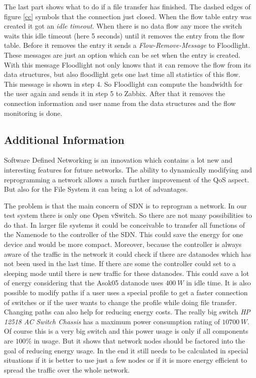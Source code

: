 The last part shows what to do if a file transfer has finished. The dashed edges of figure \ref{cc} symbols that the connection just closed. When the flow table entry was created it got an \textit{idle timeout}\cite[p. 11]{ofspec}. When there is no data flow any more the switch waits this idle timeout (here 5 seconds) until it removes the entry from the flow table. Before it removes the entry it sends a \textit{Flow-Remove-Message}\cite[p. 37]{ofspec} to Floodlight. These messages are just an option which can be set when the entry is created. With this message Floodlight not only knows that it can remove the flow from its data structures, but also floodlight gets one last time all statistics of this flow. This message is shown in step 4. So Floodlight can compute the bandwidth for the user again and sends it in step 5 to Zabbix. After that it removes the connection information and user name from the data structures and the flow monitoring is done.

\subsection{Additional Information}

Software Defined Networking is an innovation which contains a lot new and interesting features for future networks. The ability to dynamically modifying and reprogramming a network allows a much further improvement of the QoS aspect. But also for the File System it can bring a lot of advantages.

The problem is that the main concern of SDN is to reprogram a network. In our test system there is only one Open vSwitch. So there are not many possibilities to do that. In larger file systems it could be conceivable to transfer all functions of the Namenode to the controller of the SDN. This could save the energy for one device and would be more compact. Moreover, because the controller is always aware of the traffic in the network it could check if there are datanodes which has not been used in the last time. If there are some the controller could set to a sleeping mode until there is new traffic for these datanodes. This could save a lot of energy considering that the Asok05 datanode uses $400\ W$ in idle time. It is also possible to modify paths if a user uses a special profile to get a faster connection of switches or if the user wants to change the profile while doing file transfer. Changing paths can also help for reducing energy costs. The really big switch \textit{HP 12518 AC Switch Chassis} has a maximum power consumption rating of $10700\ W$\cite{hp}. Of course this is a very big switch and this power usage is only if all components are $100\%$ in usage. But it shows that network nodes should be factored into the goal of reducing energy usage. In the end it still needs to be calculated in special situations if it is better to use just a few nodes or if it is more energy efficient to spread the traffic over the whole network. 

